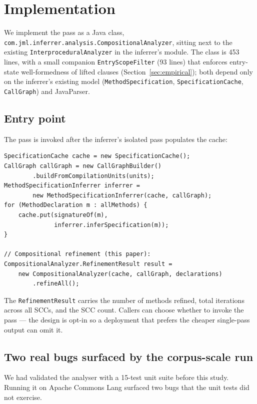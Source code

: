 \section{Implementation}
\label{sec:impl}

We implement the pass as a Java class, \texttt{com.jml.\allowbreak{}inferrer.\allowbreak{}analysis.\allowbreak{}CompositionalAnalyzer}, sitting next to the existing \texttt{InterproceduralAnalyzer} in the inferrer's module. The class is 453 lines, with a small companion
\texttt{EntryScopeFilter} (93 lines) that enforces entry-state
well-formedness of lifted clauses (Section~\ref{sec:empirical}); both
depend only on the inferrer's existing model (\texttt{MethodSpecification},
\texttt{SpecificationCache}, \texttt{CallGraph}) and JavaParser.

\subsection{Entry point}

The pass is invoked after the inferrer's isolated pass populates the
cache:

\begin{lstlisting}
SpecificationCache cache = new SpecificationCache();
CallGraph callGraph = new CallGraphBuilder()
        .buildFromCompilationUnits(units);
MethodSpecificationInferrer inferrer =
        new MethodSpecificationInferrer(cache, callGraph);
for (MethodDeclaration m : allMethods) {
    cache.put(signatureOf(m),
              inferrer.inferSpecification(m));
}

// Compositional refinement (this paper):
CompositionalAnalyzer.RefinementResult result =
    new CompositionalAnalyzer(cache, callGraph, declarations)
        .refineAll();
\end{lstlisting}

The \texttt{RefinementResult} carries the number of methods refined,
total iterations across all SCCs, and the SCC count. Callers can
choose whether to invoke the pass --- the design is opt-in so a
deployment that prefers the cheaper single-pass output can omit it.

\subsection{Two real bugs surfaced by the corpus-scale run}

We had validated the analyser with a 15-test unit suite before this
study. Running it on Apache Commons Lang surfaced two bugs that the
unit tests did not exercise.

